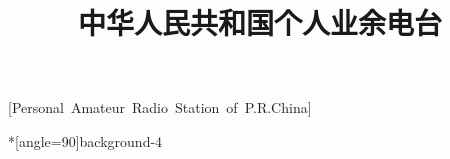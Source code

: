 \documentclass{qsl}
\begin{document}
    \title {中华人民共和国个人业余电台}[Personal~Amateur~Radio~Station~of~P.R.China]

    \begin{card}*[angle=90]{background-4}
        \bidicontourlength{2pt}  \kaishu \Huge \bfseries
         \vfill \hfill
    \end{card}




\end{document}
